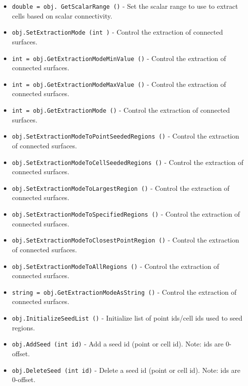 \begin{itemize}
\item  \verb|double = obj. GetScalarRange ()| -  Set the scalar range to use to extract cells based on scalar connectivity.

\item  \verb|obj.SetExtractionMode (int )| -  Control the extraction of connected surfaces.

\item  \verb|int = obj.GetExtractionModeMinValue ()| -  Control the extraction of connected surfaces.

\item  \verb|int = obj.GetExtractionModeMaxValue ()| -  Control the extraction of connected surfaces.

\item  \verb|int = obj.GetExtractionMode ()| -  Control the extraction of connected surfaces.

\item  \verb|obj.SetExtractionModeToPointSeededRegions ()| -  Control the extraction of connected surfaces.

\item  \verb|obj.SetExtractionModeToCellSeededRegions ()| -  Control the extraction of connected surfaces.

\item  \verb|obj.SetExtractionModeToLargestRegion ()| -  Control the extraction of connected surfaces.

\item  \verb|obj.SetExtractionModeToSpecifiedRegions ()| -  Control the extraction of connected surfaces.

\item  \verb|obj.SetExtractionModeToClosestPointRegion ()| -  Control the extraction of connected surfaces.

\item  \verb|obj.SetExtractionModeToAllRegions ()| -  Control the extraction of connected surfaces.

\item  \verb|string = obj.GetExtractionModeAsString ()| -  Control the extraction of connected surfaces.

\item  \verb|obj.InitializeSeedList ()| -  Initialize list of point ids/cell ids used to seed regions.

\item  \verb|obj.AddSeed (int id)| -  Add a seed id (point or cell id). Note: ids are 0-offset.

\item  \verb|obj.DeleteSeed (int id)| -  Delete a seed id (point or cell id). Note: ids are 0-offset.


\end{itemize}
